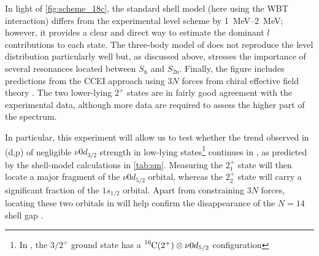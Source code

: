 \documentclass[a4paper, 10pt]{article}
\newcommand{\iso}[2]{\ce{^{#1}#2}}
\newcommand{\sn}{\ensuremath{S_{\text{n}}}\xspace}
\newcommand{\stwon}{\ensuremath{S_{\text{2n}}}\xspace}
\newcommand{\ctwos}{\ensuremath{\text{C}^2\text{S}}\xspace}
\begin{document}

In light of \autoref{fig:scheme_18c}, the standard shell model (here using the WBT interaction) differs from the experimental level scheme by \qtyrange{1}{2}{\MeV}; however, it provides a clear and direct way to estimate the dominant $l$ contributions to each \iso{18}{C} state. The three-body model of \cite{yakhelef2010} does not reproduce the level distribution particularly well but, as discussed above, stresses the importance of several resonances located between \sn and \stwon. Finally, the figure includes predictions from the CCEI approach using $3N$ forces from chiral effective field theory \cite{jansen2014}. The two lower-lying $2^+$ states are in fairly good agreement with the experimental data, although more data are required to assess the higher part of the spectrum.

In particular, this experiment will allow us to test whether the trend observed in \iso{16}{C}(d,p)\iso{17}{C} \cite{pereira-lopez2020} of negligible $\nu0d_{3/2}$ strength in low-lying states\footnote{In \iso{17}{C}, the $3/2^+$ ground state has a $\iso{16}{C}(2^+)\otimes\nu0d_{5/2}$ configuration} continues in \iso{18}{C}, as predicted by the shell-model calculations in \autoref{tab:sm}. Measuring the $2^+_1$ state will then locate a major fragment of the $\nu0d_{5/2}$ orbital, whereas the $2^+_2$ state will carry a significant fraction of the $1s_{1/2}$ orbital. Apart from constraining $3N$ forces, locating these two orbitals in \iso{18}{C} will help confirm the disappearance of the $N=14$ shell gap \cite{stanoiu2008}.
\end{document}
